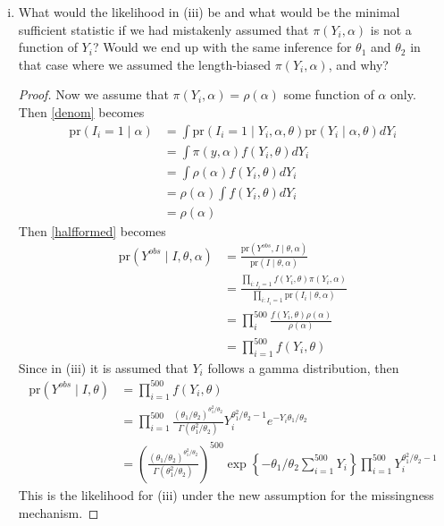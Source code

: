 \documentclass[letterpaper, 12pt]{article}
\newcommand{\pr}{\text{pr}}
\newcommand{\sbs}{\;|\;} %
\begin{document}
\begin{enumerate}[(i)]
\item 
What would the likelihood in (iii) be and what would be the minimal sufficient statistic if we had mistakenly assumed that $\pi(Y_i, \alpha)$ is not a function of $Y_i$? 
Would we end up with the same 	inference for $\theta_1$ and $\theta_2$ in that case where we assumed the length-biased $\pi(Y_i, \alpha)$, and why?

\begin{proof}
Now we assume that $\pi(Y_i, \alpha) = \rho(\alpha)$ some function of $\alpha$ only. Then \eqref{denom} becomes 
\begin{align}
\pr(I_i = 1 \sbs \alpha)
&= \int \pr(I_i = 1 \sbs Y_i, \alpha, \theta)
\pr(Y_i \sbs \alpha, \theta) dY_i
\\
&= \int \pi (y, \alpha) f (Y_i, \theta) dY_i \\
&= \int \rho(\alpha)  f (Y_i, \theta) dY_i  \\
&= \rho(\alpha)  \int f (Y_i, \theta) dY_i  \\
&= \rho(\alpha)
\end{align}
Then \eqref{halfformed} becomes
\begin{align}
\pr(Y^{obs} \sbs I, \theta, \alpha) 
&= 
\frac{\pr(Y^{obs}, I \sbs \theta, \alpha)}
{\pr(I \sbs \theta, \alpha)}
\\
&=
\frac{\prod_{i:I_i=1} f(Y_i, \theta) \pi(Y_i , \alpha)}
{\prod_{i:I_i=1}\pr(I_i \sbs \theta, \alpha)}
\\
&=
\prod_{i}^{500} 
\frac{f(Y_i, \theta) \rho(\alpha)}{\rho(\alpha)} \\
&= \prod_{i=1}^{500} 
f(Y_i, \theta)
\end{align}
Since in (iii) it is assumed that $Y_i$ follows a gamma distribution, then
\begin{align}
\pr(Y^{obs} \sbs I, \theta)
&=
\prod_{i=1}^{500} 
f(Y_i, \theta)
\\
&=
\prod_{i=1}^{500} 
\frac{(\theta_1 / \theta_2)^{\theta_1^2 / \theta_2}}{\Gamma(\theta_1^2 / \theta_2)} Y_i^{\theta_1^2 / \theta_2 - 1}e^{-Y_i \theta_1/\theta_2}
\\
&=
\left(
\frac{(\theta_1 / \theta_2)^{\theta_1^2 / \theta_2}}{\Gamma(\theta_1^2 / \theta_2)} 
\right)^{500}
\exp
\left\{
- \theta_1/\theta_2
\sum_{i=1}^{500} Y_i
\right\}
\prod_{i=1}^{500} 
Y_i^{\theta_1^2 / \theta_2 - 1}
\end{align}
This is the likelihood for (iii) under the new assumption for the missingness mechanism.


\end{proof}
\end{enumerate}
\end{document}
